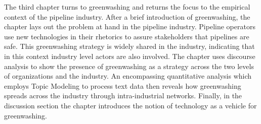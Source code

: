 The third chapter turns to greenwashing and returns the focus to the empirical context of the pipeline industry. After a brief introduction of greenwashing, the chapter lays out the problem at hand in the pipeline industry. Pipeline operators use new technologies in their rhetorics to assure stakeholders that pipelines are safe. This greenwashing strategy is widely shared in the industry, indicating that in this context industry level actors are also involved. The chapter uses discourse analysis to show the presence of greenwashing as a strategy across the two levels of organizations and the industry. An encompassing quantitative analysis which employs Topic Modeling to process text data \citep{Hannigan2019} then reveals how greenwashing spreads across the industry through intra-industrial networks. Finally, in the discussion section the chapter introduces the notion of technology as a vehicle for greenwashing. %

